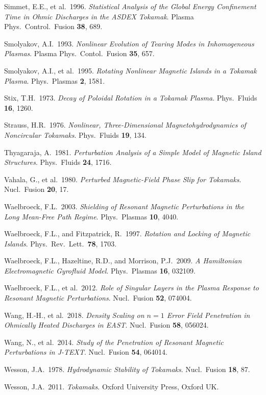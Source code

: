 \documentclass[notitlepage,12pt]{article}
\begin{document}
\begin{description}
\item Simmet, E.E., et al.\ 1996. {\em Statistical Analysis of the Global Energy Confinement Time in Ohmic Discharges in the ASDEX Tokamak}. Plasma Phys.\ Control.\ Fusion {\bf 38}, 689.
\item Smolyakov, A.I.\ 1993. {\em Nonlinear Evolution of Tearing Modes in Inhomogeneous Plasmas}. Plasma Phys.\ Contol.\ Fusion 
{\bf 35}, 657. 
\item Smolyakov, A.I., et al.\ 1995. {\em Rotating Nonlinear Magnetic Islands in a Tokamak Plasma}. Phys.\ Plasmas {\bf 2}, 1581.
\item Stix, T.H.\ 1973. {\em Decay of Poloidal Rotation in a Tokamak Plasma}. Phys.\ Fluids {\bf 16}, 1260.
\item Strauss, H.R.\ 1976. {\em Nonlinear, Three-Dimensional Magnetohydrodynamics of  Noncircular Tokamaks}. Phys.\ Fluids {\bf 19},  134.
\item Thyagaraja, A.\ 1981. {\em Perturbation Analysis of a Simple Model of Magnetic Island Structures}. Phys.\ Fluids {\bf 24}, 1716. 
\item Vahala, G., et al.\ 1980. {\em Perturbed Magnetic-Field Phase Slip for Tokamaks}. Nucl.\ Fusion {\bf 20}, 17.
\item Waelbroeck, F.L.\ 2003. {\em Shielding of Resonant Magnetic Perturbations in the Long Mean-Free Path Regime}. Phys.\ Plasmas {\bf 10}, 4040.
\item Waelbroeck, F.L., and Fitzpatrick, R.\ 1997. {\em Rotation and Locking of Magnetic Islands}. Phys.\ Rev.\ Lett.\ {\bf 78}, 1703. 
\item Waelbroeck, F.L., Hazeltine, R.D., and Morrison, P.J.\ 2009. {\em A Hamiltonian Electromagnetic Gyrofluid Model}. Phys.\ Plasmas {\bf 16}, 032109. 
\item Waelbroeck, F.L., et al.\ 2012. {\em Role of Singular Layers in the Plasma Response to Resonant Magnetic Perturbations}.
Nucl.\ Fusion {\bf 52}, 074004.
\item Wang, H.-H., et al.\ 2018. {\em Density Scaling on $n=1$ Error Field Penetration in Ohmically Heated Discharges in EAST}. 
Nucl.\ Fusion {\bf 58}, 056024. 
\item Wang, N., et al.\ 2014. {\em Study of the Penetration of Resonant Magnetic Perturbations in J-TEXT}. Nucl.\ Fusion {\bf 54}, 064014. 
\item Wesson, J.A.\  1978. {\em Hydrodynamic Stability of Tokamaks}. Nucl.\ Fusion {\bf 18}, 87.
\item Wesson, J.A.\ 2011. {\em Tokamaks}. Oxford University Press, Oxford UK.

\end{description}
\end{document}
